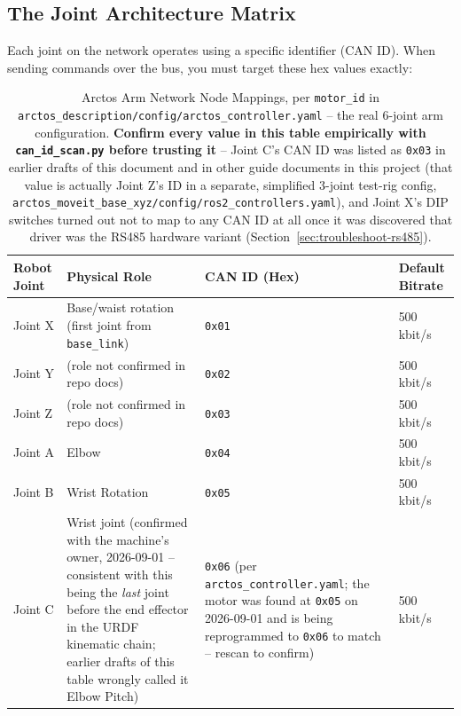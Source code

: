 \documentclass[11pt,letterpaper]{article}
\begin{document}
\subsection{The Joint Architecture Matrix}
Each joint on the network operates using a specific identifier (CAN ID). When sending commands over the bus, you must target these hex values exactly:
\begin{table}[h]
\centering
\begin{tabular}{llll}
\toprule
\textbf{Robot Joint} & \textbf{Physical Role} & \textbf{CAN ID (Hex)} & \textbf{Default Bitrate} \\ \midrule
Joint X              & Base/waist rotation (first joint from \texttt{base\_link}) & \texttt{0x01} & 500 kbit/s \\
Joint Y              & (role not confirmed in repo docs) & \texttt{0x02}         & 500 kbit/s               \\
Joint Z              & (role not confirmed in repo docs) & \texttt{0x03}         & 500 kbit/s               \\
Joint A              & Elbow & \texttt{0x04}         & 500 kbit/s               \\
Joint B              & Wrist Rotation         & \texttt{0x05}         & 500 kbit/s               \\
Joint C              & Wrist joint (confirmed with the machine's owner, 2026-09-01 -- consistent with this being the \emph{last} joint before the end effector in the URDF kinematic chain; earlier drafts of this table wrongly called it Elbow Pitch) & \texttt{0x06} (per \texttt{arctos\_controller.yaml}; the motor was found at \texttt{0x05} on 2026-09-01 and is being reprogrammed to \texttt{0x06} to match -- rescan to confirm) & 500 kbit/s \\ \bottomrule
\end{tabular}
\caption{Arctos Arm Network Node Mappings, per \texttt{motor\_id} in \texttt{arctos\_description/config/arctos\_controller.yaml} -- the real 6-joint arm configuration. \textbf{Confirm every value in this table empirically with \texttt{can\_id\_scan.py} before trusting it} -- Joint C's CAN ID was listed as \texttt{0x03} in earlier drafts of this document and in other guide documents in this project (that value is actually Joint Z's ID in a separate, simplified 3-joint test-rig config, \texttt{arctos\_moveit\_base\_xyz/config/ros2\_controllers.yaml}), and Joint X's DIP switches turned out not to map to any CAN ID at all once it was discovered that driver was the RS485 hardware variant (Section~\ref{sec:troubleshoot-rs485}).}
\end{table}
\end{document}
